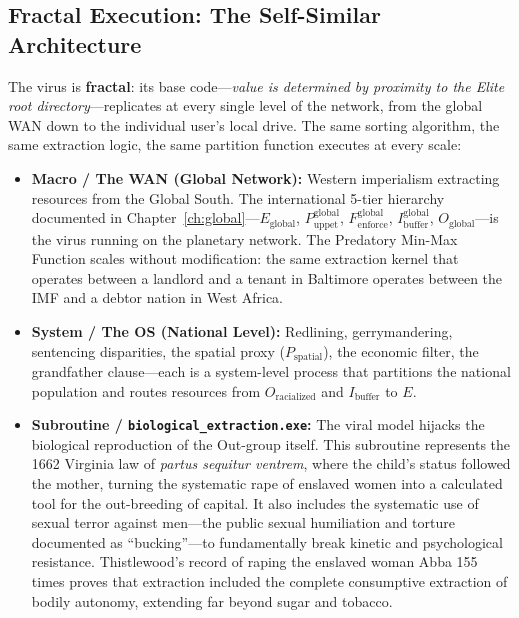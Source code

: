 \subsection{Fractal Execution: The Self-Similar Architecture}

The virus is \textbf{fractal}: its base code---\textit{value is determined by proximity to the Elite root directory}---replicates at every single level of the network, from the global WAN down to the individual user's local drive. The same sorting algorithm, the same extraction logic, the same partition function executes at every scale:

\begin{itemize}
    \item \textbf{Macro / The WAN (Global Network):} Western imperialism extracting resources from the Global South. The international 5-tier hierarchy documented in Chapter~\ref{ch:global}---$E_{\text{global}}$, $P_{\text{uppet}}^{\text{global}}$, $F_{\text{enforce}}^{\text{global}}$, $I_{\text{buffer}}^{\text{global}}$, $O_{\text{global}}$---is the virus running on the planetary network. The Predatory Min-Max Function scales without modification: the same extraction kernel that operates between a landlord and a tenant in Baltimore operates between the IMF and a debtor nation in West Africa.

    \item \textbf{System / The OS (National Level):} Redlining, gerrymandering, sentencing disparities, the spatial proxy ($P_{\text{spatial}}$), the economic filter, the grandfather clause---each is a system-level process that partitions the national population and routes resources from $O_{\text{racialized}}$ and $I_{\text{buffer}}$ to $E$.

    \item \textbf{Subroutine / \texttt{biological\_extraction.exe}:} The viral model hijacks the biological reproduction of the Out-group itself. This subroutine represents the 1662 Virginia law of \textit{partus sequitur ventrem}, where the child's status followed the mother, turning the systematic rape of enslaved women into a calculated tool for the out-breeding of capital. It also includes the systematic use of sexual terror against men---the public sexual humiliation and torture documented as ``bucking''---to fundamentally break kinetic and psychological resistance. Thistlewood's record of raping the enslaved woman Abba 155 times proves that extraction included the complete consumptive extraction of bodily autonomy, extending far beyond sugar and tobacco.


\end{itemize}
